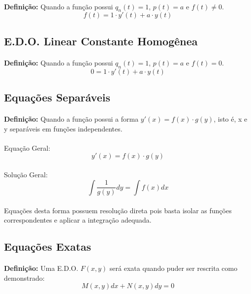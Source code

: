 \documentclass{article}
\begin{document}
        \paragraph{}\textbf{Definição:} Quando a função possui $q_{n}(t) = 1$, $p(t) = a$ e $f(t) \neq 0$.
            \[f(t) = 1 \cdot y'(t) + a \cdot y(t)\]
    
    \subsection{E.D.O. Linear Constante Homogênea}
        \paragraph{}\textbf{Definição:} Quando a função possui $q_{n}(t) = 1$, $p(t) = a$ e $f(t) = 0$.
            \[0 = 1 \cdot y'(t) + a \cdot y(t)\]
        
    \subsection{Equações Separáveis}
        \paragraph{}\textbf{Definição:} Quando a função possui a forma $y'(x)=f(x) \cdot g(y)$, isto é,  x e y separáveis em funções independentes.
        \paragraph{}Equação Geral:
            \[y'(x)=f(x) \cdot g(y)\]
        
        \paragraph{}Solução Geral:
            \[\int{\frac{1}{g(y)}dy} = \int{f(x)dx}\]
        \paragraph{}Equações desta forma possuem resolução direta pois basta isolar as funções correspondentes e aplicar a integração adequada.
    
    \subsection{Equações Exatas}
        \paragraph{}\textbf{Definição:} Uma E.D.O. $F(x,y)$ será exata quando puder ser rescrita como demonstrado:
            \[M(x,y)dx+N(x,y)dy=0\]
\end{document}
